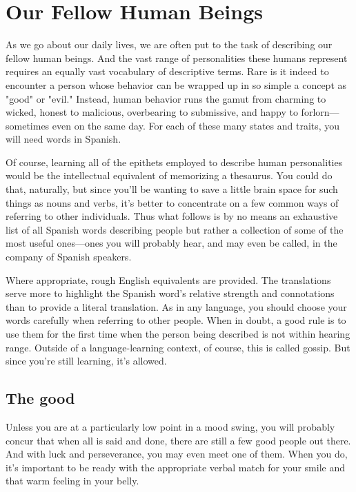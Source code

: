 \documentclass[14pt,a4paper,oneside]{memoir}
\begin{document}
\chapter{Our Fellow Human Beings}

As we go about our daily lives, we are often put to the task of
describing our fellow human beings. And the vast range of personalities these humans represent requires an equally vast vocabulary of descriptive terms. Rare is it indeed to encounter a person whose behavior
can be wrapped up in so simple a concept as "good" or "evil." Instead,
human behavior runs the gamut from charming to wicked, honest to
malicious, overbearing to submissive, and happy to forlorn---sometimes even on the same day. For each of these many states and traits,
you will need words in Spanish.

Of course, learning all of the epithets employed to describe human personalities would be the intellectual equivalent of memorizing
a thesaurus. You could do that, naturally, but since you'll be wanting
to save a little brain space for such things as nouns and verbs, it's better to concentrate on a few common ways of referring to other individuals. Thus what follows is by no means an exhaustive list of all Spanish words describing people but rather a collection of some of the most
useful ones---ones you will probably hear, and may even be called, in
the company of Spanish speakers.

Where appropriate, rough English equivalents are provided.
The translations serve more to highlight the Spanish word's relative
strength and connotations than to provide a literal translation. As in
any language, you should choose your words carefully when referring
to other people. When in doubt, a good rule is to use them for the first
time when the person being described is not within hearing range.
Outside of a language-learning context, of course, this is called gossip.
But since you're still learning, it's allowed.

\section{The good}

Unless you are at a particularly low point in a mood swing,
you will probably concur that when all is said and done, there are still
a few good people out there. And with luck and perseverance, you may
even meet one of them. When you do, it's important to be ready with
the appropriate verbal match for your smile and that warm feeling in
your belly.
\end{document}
